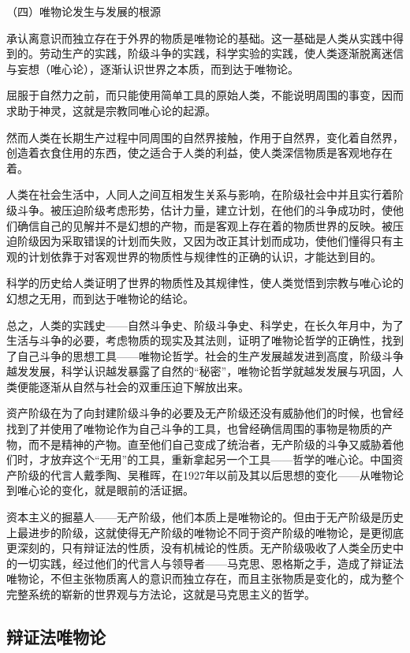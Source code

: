 \documentclass[UTF8, 12pt, a4paper]{ctexrep}
\begin{document}
（四）唯物论发生与发展的根源

承认离意识而独立存在于外界的物质是唯物论的基础。这一基础是人类从实践中得到的。劳动生产的实践，阶级斗争的实践，科学实验的实践，使人类逐渐脱离迷信与妄想（唯心论），逐渐认识世界之本质，而到达于唯物论。

屈服于自然力之前，而只能使用简单工具的原始人类，不能说明周围的事变，因而求助于神灵，这就是宗教同唯心论的起源。

然而人类在长期生产过程中同周围的自然界接触，作用于自然界，变化着自然界，创造着衣食住用的东西，使之适合于人类的利益，使人类深信物质是客观地存在着。

人类在社会生活中，人同人之间互相发生关系与影响，在阶级社会中并且实行着阶级斗争。被压迫阶级考虑形势，估计力量，建立计划，在他们的斗争成功时，使他们确信自己的见解并不是幻想的产物，而是客观上存在着的物质世界的反映。被压迫阶级因为采取错误的计划而失败，又因为改正其计划而成功，使他们懂得只有主观的计划依靠于对客观世界的物质性与规律性的正确的认识，才能达到目的。

科学的历史给人类证明了世界的物质性及其规律性，使人类觉悟到宗教与唯心论的幻想之无用，而到达于唯物论的结论。

总之，人类的实践史——自然斗争史、阶级斗争史、科学史，在长久年月中，为了生活与斗争的必要，考虑物质的现实及其法则，证明了唯物论哲学的正确性，找到了自己斗争的思想工具——唯物论哲学。社会的生产发展越发进到高度，阶级斗争越发发展，科学认识越发暴露了自然的“秘密”，唯物论哲学就越发发展与巩固，人类便能逐渐从自然与社会的双重压迫下解放出来。

资产阶级在为了向封建阶级斗争的必要及无产阶级还没有威胁他们的时候，也曾经找到了并使用了唯物论作为自己斗争的工具，也曾经确信周围的事物是物质的产物，而不是精神的产物。直至他们自己变成了统治者，无产阶级的斗争又威胁着他们时，才放弃这个“无用”的工具，重新拿起另一个工具——哲学的唯心论。中国资产阶级的代言人戴季陶、吴稚晖，在1927年以前及其以后思想的变化——从唯物论到唯心论的变化，就是眼前的活证据。

资本主义的掘墓人——无产阶级，他们本质上是唯物论的。但由于无产阶级是历史上最进步的阶级，这就使得无产阶级的唯物论不同于资产阶级的唯物论，是更彻底更深刻的，只有辩证法的性质，没有机械论的性质。无产阶级吸收了人类全历史中的一切实践，经过他们的代言人与领导者——马克思、恩格斯之手，造成了辩证法唯物论，不但主张物质离人的意识而独立存在，而且主张物质是变化的，成为整个完整系统的崭新的世界观与方法论，这就是马克思主义的哲学。

\subsection{辩证法唯物论}
\end{document}
